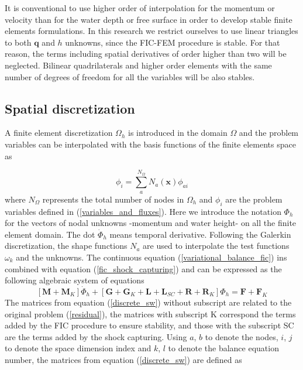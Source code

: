 \documentclass[a4paper,12pt]{article}
\begin{document}
It is conventional to use higher order of interpolation for the momentum or velocity than for the water depth or free surface \cite{hood1974,heniche2000,bercovier1979} in order to develop stable finite elements formulations. In this research we restrict ourselves to use linear triangles to both $\mathbf{q}$ and $h$ unknowns, since the FIC-FEM procedure is stable. For that reason, the terms including spatial derivatives of order higher than two will be neglected. Bilinear quadrilaterals and higher order elements with the same number of degrees of freedom for all the variables will be also stables.

\subsection{Spatial discretization}

A finite element discretization $\Omega_h$ is introduced in the domain $\Omega$ and the problem variables can be interpolated with the basis functions of the finite elements space as

\begin{equation}
\phi_i = \sum_a^{N_\Omega} N_a(\mathbf{x})\phi_{ai}
\end{equation}
where $N_\Omega$ represents the total number of nodes in $\Omega_h$ and $\phi_i$ are the problem variables defined in (\ref{variables_and_fluxes}). Here we introduce the notation $\Phi_h$ for the vectors of nodal unknowns -momentum and water height- on all the finite element domain. The dot $\dot\Phi_h$ means temporal derivative. Following the Galerkin discretization, the shape functions $N_a$ are used to interpolate the test functions $\omega_k$ and the unknowns. The continuous equation (\ref{variational_balance_fic}) ins combined with equation (\ref{fic_shock_capturing}) and can be expressed as the following algebraic system of equations
\begin{equation} \label{discrete_sw}
[\mathbf{M} + \mathbf{M}_K] \dot{\Phi}_h
+ [\mathbf{G} + \mathbf{G}_K + \mathbf{L} + \mathbf{L}_{SC} + \mathbf{R} + \mathbf{R}_K] \Phi_h
= \mathbf{F} + \mathbf{F}_K
\end{equation}
The matrices from equation (\ref{discrete_sw}) without subscript are related to the original problem (\ref{residual}), the matrices with subscript K correspond the terms added by the FIC procedure to ensure stability, and those with the subscript SC are the terms added by the shock capturing. Using $a$, $b$ to denote the nodes, $i$, $j$ to denote the space dimension index and $k$, $l$ to denote the balance equation number, the matrices from equation (\ref{discrete_sw}) are defined as
\end{document}
